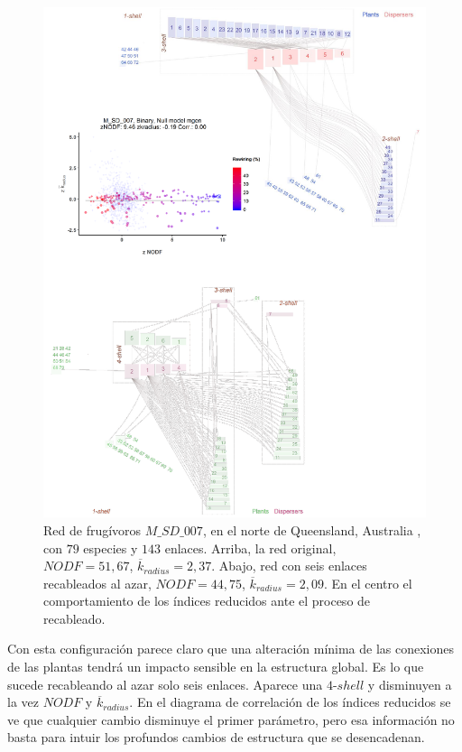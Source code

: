 \clearpage
\begin{figure}[ht!]
\centering
\includegraphics[scale=0.8]{Figures/VIS_SD_007.pdf}
\caption {Red de frugívoros $M\_SD\_007$, en el norte de Queensland, Australia \cite{crome1975ecology}, con $79$ especies y $143$ enlaces. Arriba, la red original, $NODF = 51,67$, $\overline k_{radius} = 2,37$. Abajo, red con seis enlaces recableados al azar, $NODF = 44,75$, $\overline k_{radius} = 2,09$. En el centro el comportamiento de los índices reducidos ante el proceso de recableado.}
\label{fig:VIS_SD_007}
\end{figure}

\clearpage
Con esta configuración parece claro que una alteración mínima de las conexiones de las plantas tendrá un impacto sensible en la estructura global. Es lo que sucede recableando al azar solo seis enlaces. Aparece una $4$-$shell$ y disminuyen a la vez $NODF$ y  $\overline k_{radius}$. En el diagrama de correlación de los índices reducidos se ve que cualquier cambio disminuye el primer parámetro, pero esa información no basta para intuir los profundos cambios de estructura que se desencadenan.


